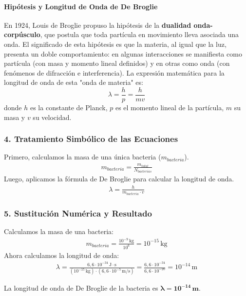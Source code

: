 \paragraph*{Hipótesis y Longitud de Onda de De Broglie}
En 1924, Louis de Broglie propuso la hipótesis de la \textbf{dualidad onda-corpúsculo}, que postula que toda partícula en movimiento lleva asociada una onda. El significado de esta hipótesis es que la materia, al igual que la luz, presenta un doble comportamiento: en algunas interacciones se manifiesta como partícula (con masa y momento lineal definidos) y en otras como onda (con fenómenos de difracción e interferencia).
La expresión matemática para la longitud de onda de esta "onda de materia" es:
$$ \lambda = \frac{h}{p} = \frac{h}{mv} $$
donde $h$ es la constante de Planck, $p$ es el momento lineal de la partícula, $m$ su masa y $v$ su velocidad.

\subsubsection*{4. Tratamiento Simbólico de las Ecuaciones}
Primero, calculamos la masa de una única bacteria ($m_{bacteria}$).
\begin{gather}
    m_{bacteria} = \frac{m_{total}}{N_{bacterias}}
\end{gather}
Luego, aplicamos la fórmula de De Broglie para calcular la longitud de onda.
\begin{gather}
    \lambda = \frac{h}{m_{bacteria} \cdot v}
\end{gather}

\subsubsection*{5. Sustitución Numérica y Resultado}
Calculamos la masa de una bacteria:
\begin{gather}
    m_{bacteria} = \frac{10^{-9}\,\text{kg}}{10^6} = 10^{-15}\,\text{kg}
\end{gather}
Ahora calculamos la longitud de onda:
\begin{gather}
    \lambda = \frac{6,6 \cdot 10^{-34}\,\text{J}\cdot\text{s}}{(10^{-15}\,\text{kg}) \cdot (6,6 \cdot 10^{-5}\,\text{m/s})} = \frac{6,6 \cdot 10^{-34}}{6,6 \cdot 10^{-20}} = 10^{-14}\,\text{m}
\end{gather}
\begin{cajaresultado}
    La longitud de onda de De Broglie de la bacteria es $\boldsymbol{\lambda = 10^{-14}\,\textbf{m}}$.
\end{cajaresultado}

